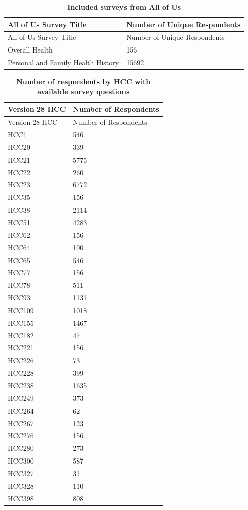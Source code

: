 \documentclass[
  12pt,
  number]{elsarticle}
\begin{document}
\begin{longtable}[]{@{}ll@{}}
\caption{\textbf{Included surveys from All of Us}}\tabularnewline
\toprule\noalign{}
All of Us Survey Title & Number of Unique Respondents \\
\midrule\noalign{}
\endfirsthead
\toprule\noalign{}
All of Us Survey Title & Number of Unique Respondents \\
\midrule\noalign{}
\endhead
\bottomrule\noalign{}
\endlastfoot
Overall Health & 156 \\
Personal and Family Health History & 15692 \\
\end{longtable}

\begin{longtable}[]{@{}ll@{}}
\caption{\textbf{Number of respondents by HCC with available survey
questions}}\tabularnewline
\toprule\noalign{}
Version 28 HCC & Number of Respondents \\
\midrule\noalign{}
\endfirsthead
\toprule\noalign{}
Version 28 HCC & Number of Respondents \\
\midrule\noalign{}
\endhead
\bottomrule\noalign{}
\endlastfoot
HCC1 & 546 \\
HCC20 & 339 \\
HCC21 & 5775 \\
HCC22 & 260 \\
HCC23 & 6772 \\
HCC35 & 156 \\
HCC38 & 2114 \\
HCC51 & 4283 \\
HCC62 & 156 \\
HCC64 & 100 \\
HCC65 & 546 \\
HCC77 & 156 \\
HCC78 & 511 \\
HCC93 & 1131 \\
HCC109 & 1018 \\
HCC155 & 1467 \\
HCC182 & 47 \\
HCC221 & 156 \\
HCC226 & 73 \\
HCC228 & 399 \\
HCC238 & 1635 \\
HCC249 & 373 \\
HCC264 & 62 \\
HCC267 & 123 \\
HCC276 & 156 \\
HCC280 & 273 \\
HCC300 & 587 \\
HCC327 & 31 \\
HCC328 & 110 \\
HCC398 & 808 \\
\end{longtable}
\end{document}
